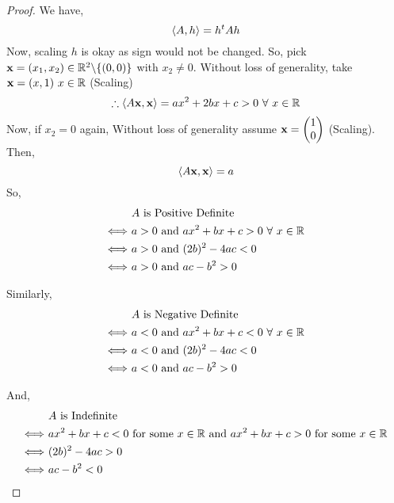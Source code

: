 \documentclass[../Analysis-3.tex]{subfiles}
\begin{document}
\begin{proof}
  We have, \[ \left\langle {A}, {h} \right\rangle = h^tAh \]
  Now, scaling $h$ is okay as sign would not be changed. So, pick ${\bf x} = (x_1, x_2) \in \mathbb{R}^2 \backslash \{(0,0)\} $ with $x_2 \neq 0$.
  Without loss of generality, take ${\bf x} = (x,1) \ x \in \mathbb{R}$ (Scaling) \\
  \[ \therefore \left\langle {A\bf{x}}, {\bf{x}} \right\rangle = ax^2 + 2bx + c > 0 \ \forall\ x \in \mathbb{R} \]
  Now, if $x_2 = 0$ again, Without loss of generality assume ${\bf x} = \begin{pmatrix}
      1 \\
      0
    \end{pmatrix}$ (Scaling). Then, \[ \left\langle {A\bf{x}}, {\bf{x}} \right\rangle = a \]
  So,
  \begin{align*}
                        & \ A \text{ is Positive Definite}                         \\
    \Longleftrightarrow & \ a > 0 \text{ and } ax^2 + bx+c > 0 \ \forall\ x \in \mathbb{R} \\
    \Longleftrightarrow & \ a > 0 \text{ and } (2b)^2 - 4ac < 0                    \\
    \Longleftrightarrow & \ a > 0 \text{ and } ac - b^2 > 0
  \end{align*}

  Similarly,
  \begin{align*}
                        & \ A \text{ is Negative Definite}                         \\
    \Longleftrightarrow & \ a < 0 \text{ and } ax^2 + bx+c < 0 \ \forall\ x \in \mathbb{R} \\
    \Longleftrightarrow & \ a < 0 \text{ and } (2b)^2 - 4ac < 0                    \\
    \Longleftrightarrow & \ a < 0 \text{ and } ac - b^2 > 0
  \end{align*}

  And,
  \begin{align*}
                        & \ A \text{ is Indefinite}                                                                              \\
    \Longleftrightarrow & \ ax^2 + bx+c < 0 \ \text{for some } x \in \mathbb{R} \text{ and } ax^2 + bx+c > 0 \ \text{for some } x \in \mathbb{R} \\
    \Longleftrightarrow & \ (2b)^2 - 4ac > 0                                                                                     \\
    \Longleftrightarrow & \ ac - b^2 < 0
  \end{align*}
\end{proof}
\end{document}
